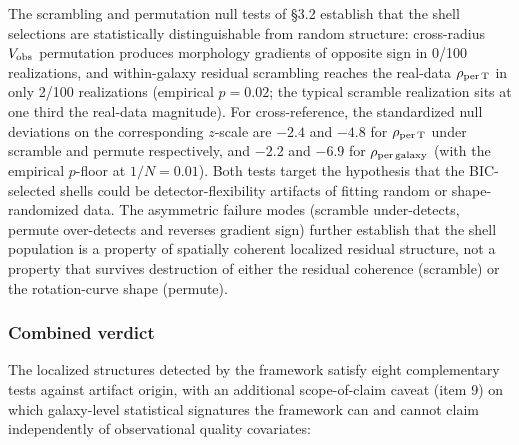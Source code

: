\documentclass[linenumbers,trackchanges]{aastex701}
\begin{document}
The scrambling and permutation null tests of \S3.2 establish that the shell selections are statistically distinguishable from random structure: cross-radius $V_{\rm obs}$ permutation produces morphology gradients of opposite sign in 0/100 realizations, and within-galaxy residual scrambling reaches the real-data $\rho_{\rm per\,T}$ in only 2/100 realizations (empirical $p = 0.02$; the typical scramble realization sits at one third the real-data magnitude). For cross-reference, the standardized null deviations on the corresponding $z$-scale are $-2.4$ and $-4.8$ for $\rho_{\rm per\,T}$ under scramble and permute respectively, and $-2.2$ and $-6.9$ for $\rho_{\rm per\,galaxy}$ (with the empirical $p$-floor at $1/N = 0.01$). Both tests target the hypothesis that the BIC-selected shells could be detector-flexibility artifacts of fitting random or shape-randomized data. The asymmetric failure modes (scramble under-detects, permute over-detects and reverses gradient sign) further establish that the shell population is a property of spatially coherent localized residual structure, not a property that survives destruction of either the residual coherence (scramble) or the rotation-curve shape (permute).

\subsubsection{Combined verdict}

The localized structures detected by the framework satisfy eight complementary tests against artifact origin, with an additional scope-of-claim caveat (item 9) on which galaxy-level statistical signatures the framework can and cannot claim independently of observational quality covariates:
\end{document}
